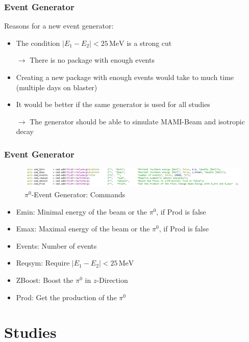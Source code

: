 \documentclass[slidestop,compress,mathserif]{beamer}
\begin{document}
\begin{frame}
\frametitle{Event Generator}
Reasons for a new event generator:
\pause
\begin{itemize}
	\item The condition $|E_1 - E_2|<25\,\text{MeV}$ is a strong cut 
	
	$\rightarrow$ There is no package with enough events
	\pause
	
	\item Creating a new package with enough events would take to much time (multiple days on blaster)
	\pause
	
	\item It would be better if the same generator is used for all studies
	
	$\rightarrow$ The generator should be able to simulate MAMI-Beam and isotropic decay 
\end{itemize}
\end{frame}

\begin{frame}
	\frametitle{Event Generator}
	\begin{figure}
		\includegraphics[width=1.1\textwidth]{Pictures/Gun}
		\caption{$\pi^0$-Event Generator: Commands}
	\end{figure}
	\begin{itemize}
		\item Emin: Minimal energy of the beam or the $\pi^0$, if Prod is false
		\item Emax: Maximal energy of the beam or the $\pi^0$, if Prod is false
		\item Events: Number of events
		\item Reqsym: Require $|E_{1}-E_{2}|<25\,\text{MeV}$
		\item ZBoost: Boost the $\pi^0$ in $z$-Direction
		\item Prod: Get the production of the $\pi^0$
	\end{itemize}
\end{frame}

\section{Studies}
\end{document}
